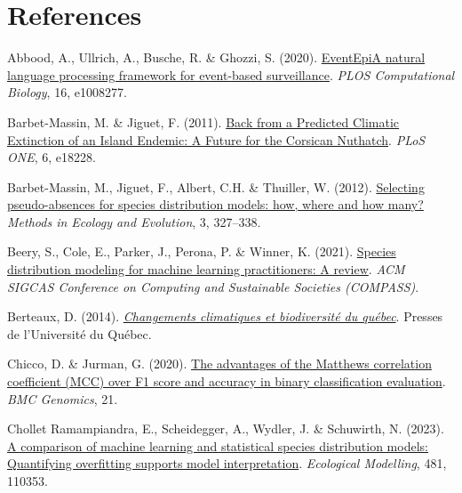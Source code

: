 \documentclass[
  letterpaper,
]{scrbook}
\newlength{\cslhangindent}
\newenvironment{CSLReferences}[2] %
 {\begin{list}{}{%
  \setlength{\itemindent}{0pt}
  \setlength{\leftmargin}{0pt}
  \setlength{\parsep}{0pt}
  \ifodd #1
   \setlength{\leftmargin}{\cslhangindent}
   \setlength{\itemindent}{-1\cslhangindent}
  \fi
  \setlength{\itemsep}{#2\baselineskip}}}
 {\end{list}}
\begin{document}
\section*{References}\label{bibliography-5}


\label{refs-5}
\begin{CSLReferences}{1}{0}
Abbood, A., Ullrich, A., Busche, R. \& Ghozzi, S. (2020).
\href{https://doi.org/10.1371/journal.pcbi.1008277}{EventEpi{\textemdash}A
natural language processing framework for event-based surveillance}.
\emph{PLOS Computational Biology}, 16, e1008277.

Barbet-Massin, M. \& Jiguet, F. (2011).
\href{https://doi.org/10.1371/journal.pone.0018228}{Back from a
Predicted Climatic Extinction of an Island Endemic: A Future for the
Corsican Nuthatch}. \emph{PLoS ONE}, 6, e18228.

Barbet-Massin, M., Jiguet, F., Albert, C.H. \& Thuiller, W. (2012).
\href{https://doi.org/10.1111/j.2041-210x.2011.00172.x}{Selecting
pseudo-absences for species distribution models: how, where and how
many?} \emph{Methods in Ecology and Evolution}, 3, 327--338.

Beery, S., Cole, E., Parker, J., Perona, P. \& Winner, K. (2021).
\href{https://doi.org/10.1145/3460112.3471966}{Species distribution
modeling for machine learning practitioners: A review}. \emph{ACM SIGCAS
Conference on Computing and Sustainable Societies (COMPASS)}.

Berteaux, D. (2014).
\emph{\href{https://doi.org/10.1353/book35753}{Changements climatiques
et biodiversité du québec}}. Presses de l'Université du Québec.

Chicco, D. \& Jurman, G. (2020).
\href{https://doi.org/10.1186/s12864-019-6413-7}{The advantages of the
Matthews correlation coefficient (MCC) over F1 score and accuracy in
binary classification evaluation}. \emph{BMC Genomics}, 21.

Chollet Ramampiandra, E., Scheidegger, A., Wydler, J. \& Schuwirth, N.
(2023). \href{https://doi.org/10.1016/j.ecolmodel.2023.110353}{A
comparison of machine learning and statistical species distribution
models: Quantifying overfitting supports model interpretation}.
\emph{Ecological Modelling}, 481, 110353.


\end{CSLReferences}
\end{document}
